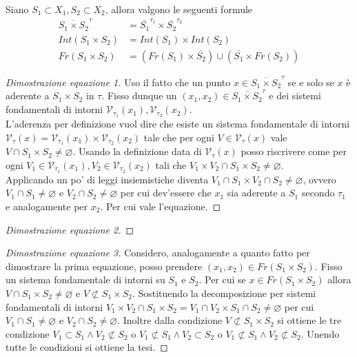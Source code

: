 \begin{theorem}
	Siano $S_1 \subset X_1, S_2 \subset X_2$, allora valgono le seguenti formule
	\begin{equation}
	\begin{aligned}
		\overline{S_1\times S_2}^{\tau} & = \overline{S_1}^{\tau_1} \times \overline{S_2}^{\tau_2} \\
		Int(S_1 \times S_2) & = Int(S_1) \times Int(S_2)\\
		Fr(S_1 \times S_2) &= (Fr(S_1) \times \overline{S_2}) \cup (\overline{S_1} \times Fr(S_2))
	\end{aligned}
	\end{equation}
\end{theorem}
\begin{proof}[Dimostrazione equazione 1]
	Uso il fatto che un punto $x \in \overline{S_1\times S_2}^\tau$ se e solo se $x$ è aderente a $S_1 \times S_2$ in $\tau$. Fisso dunque un $(x_1, x_2) \in \overline{S_1\times S_2}^\tau$ e dei sistemi fondamentali di intorni $\mathcal{V}_{\tau_1}(x_1), \mathcal{V}_{\tau_2}(x_2)$.\\
	L'aderenza per definizione vuol dire che esiste un sistema fondamentale di intorni $\mathcal{V}_\tau(x) = \mathcal{V}_{\tau_1}(x_1) \times \mathcal{V}_{\tau_2}(x_2)$ tale che per ogni $V \in \mathcal{V}_\tau(x)$ vale $V \cap S_1 \times S_2 \neq \varnothing$. Usando la definizione data di $\mathcal{V}_\tau(x)$ posso riscrivere come per ogni $V_1 \in \mathcal{V}_{\tau_1}(x_1), V_2 \in \mathcal{V}_{\tau_2}(x_2)$ tali che $V_1 \times V_2 \cap S_1 \times S_2 \neq \varnothing$. \\
	Applicando un po' di leggi insiemistiche diventa $V_1 \cap S_1 \times V_2 \cap S_2 \neq \varnothing$, ovvero $V_1 \cap S_1 \neq \varnothing$ e $V_2 \cap S_2\neq \varnothing$ per cui dev'essere che $x_1$ sia aderente a $S_1$ secondo $\tau_1$ e analogamente per $x_2$. Per cui vale l'equazione. 
\end{proof}
\begin{proof}[Dimostrazione equazione 2]
\end{proof}
\begin{proof}[Dimostrazione equazione 3]
	Considero, analogamente a quanto fatto per dimostrare la prima equazione, posso prendere $(x_1,x_2) \in Fr(S_1 \times S_2)$. Fisso un sistema fondamentale di intorni su $S_1$ e $S_2$. Per cui se $x \in Fr(S_1 \times S_2)$ allora $V \cap S_1 \times S_2\neq \varnothing$ e $V \not\subset S_1 \times S_2$. Sostituendo la decomposizione per sistemi fondamentali di intorni $V_1 \times V_2 \cap S_1 \times S_2 = V_1 \cap V_2 \times S_1 \cap S_2\neq \varnothing$ per cui $V_1 \cap S_1 \neq \varnothing$ e $V_2 \cap S_2 \neq \varnothing$. Inoltre dalla condizione $V \not\subset S_1 \times S_2$ si ottiene le tre condizione $V_1 \subset S_1 \land V_2 \not\subset S_2$ o $V_1 \not\subset S_1 \land V_2 \subset S_2$ o $V_1 \not\subset S_1 \land V_2 \not\subset S_2$. Unendo tutte le condizioni si ottiene la tesi. 
\end{proof}

